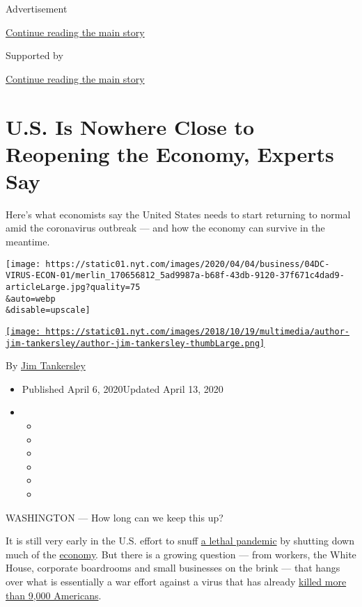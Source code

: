 Advertisement

\protect\hyperlink{after-top}{Continue reading the main story}

Supported by

\protect\hyperlink{after-sponsor}{Continue reading the main story}

\hypertarget{us-is-nowhere-close-to-reopening-the-economy-experts-say}{%
\section{U.S. Is Nowhere Close to Reopening the Economy, Experts
Say}\label{us-is-nowhere-close-to-reopening-the-economy-experts-say}}

Here's what economists say the United States needs to start returning to
normal amid the coronavirus outbreak --- and how the economy can survive
in the meantime.

\texttt{[image: https://static01.nyt.com/images/2020/04/04/business/04DC-VIRUS-ECON-01/merlin\_170656812\_5ad9987a-b68f-43db-9120-37f671c4dad9-articleLarge.jpg?quality=75\\\&auto=webp\\\&disable=upscale]}

\href{https://www.nytimes.com/by/jim-tankersley}{\texttt{[image: https://static01.nyt.com/images/2018/10/19/multimedia/author-jim-tankersley/author-jim-tankersley-thumbLarge.png]}}

By \href{https://www.nytimes.com/by/jim-tankersley}{Jim Tankersley}

\begin{itemize}
\item
  Published April 6, 2020Updated April 13, 2020
\item
  \begin{itemize}
  \item
  \item
  \item
  \item
  \item
  \item
  \end{itemize}
\end{itemize}

WASHINGTON --- How long can we keep this up?

It is still very early in the U.S. effort to snuff
\href{https://www.nytimes.com/news-event/coronavirus}{a lethal pandemic}
by shutting down much of the
\href{https://www.nytimes.com/2020/04/13/business/coronavirus-economy.html}{economy}.
But there is a growing question --- from workers, the White House,
corporate boardrooms and small businesses on the brink --- that hangs
over what is essentially a war effort against a virus that has already
\href{https://coronavirus.jhu.edu/map.html}{killed more than 9,000
Americans}.

